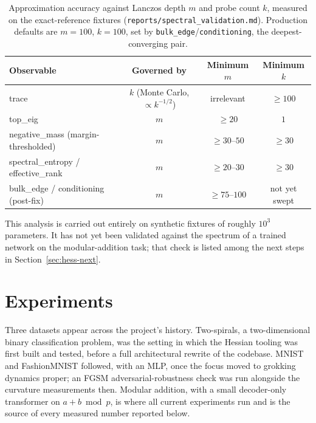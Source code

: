 \documentclass[11pt,a4paper]{article}
\begin{document}
\begin{table}[htbp]
\centering
\small
\begin{tabular}{lccc}
\toprule
Observable & Governed by & Minimum $m$ & Minimum $k$ \\
\midrule
trace & $k$ (Monte Carlo, $\propto k^{-1/2}$) & irrelevant & $\ge 100$ \\
top\_eig & $m$ & $\ge 20$ & $1$ \\
negative\_mass (margin-thresholded) & $m$ & $\ge 30$--$50$ & $\ge 30$ \\
spectral\_entropy / effective\_rank & $m$ & $\ge 20$--$30$ & $\ge 30$ \\
bulk\_edge / conditioning (post-fix) & $m$ & $\ge 75$--$100$ & not yet swept \\
\bottomrule
\end{tabular}
\caption{Approximation accuracy against Lanczos depth $m$ and probe count $k$,
measured on the exact-reference fixtures
(\texttt{reports/spectral\_validation.md}). Production defaults are $m=100$,
$k=100$, set by \texttt{bulk\_edge}/\texttt{conditioning}, the deepest-converging
pair.}
\label{tab:hess-mk}
\end{table}

This analysis is carried out entirely on synthetic fixtures of roughly $10^3$
parameters. It has not yet been validated against the spectrum of a trained
network on the modular-addition task; that check is listed among the next steps
in Section~\ref{sec:hess-next}.

\section{Experiments}
\label{sec:hess-experiments}

Three datasets appear across the project's history. Two-spirals, a
two-dimensional binary classification problem, was the setting in which the
Hessian tooling was first built and tested, before a full architectural rewrite
of the codebase. MNIST and FashionMNIST followed, with an MLP, once the focus
moved to grokking dynamics proper; an FGSM adversarial-robustness check was run
alongside the curvature measurements then. Modular addition, with a
small decoder-only transformer on $a+b \bmod p$, is where all current
experiments run and is the source of every measured number reported below.
\end{document}
